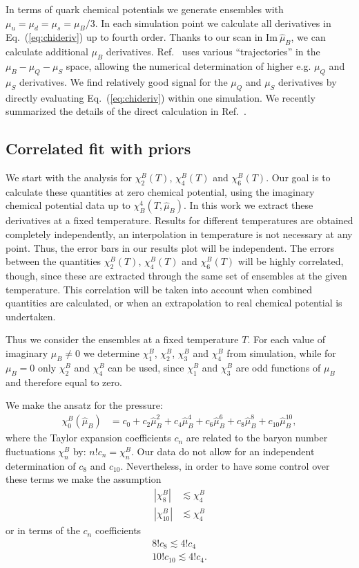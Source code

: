 \documentclass[a4paper,11pt]{article}
\begin{document}
In terms of quark chemical potentials we generate ensembles with $\mu_u=\mu_d=\mu_s=\mu_B/3$. 
In each simulation point we calculate all derivatives in Eq.~(\ref{eq:chideriv}) up to fourth order.
Thanks to our scan in $\mathrm{Im}~\hat\mu_B$, we can calculate additional $\mu_B$ derivatives.
Ref.~\cite{DElia:2016jqh} uses various ``trajectories'' in the $\mu_B-\mu_Q-\mu_S$ space, allowing
the numerical determination of higher e.g. $\mu_Q$ and $\mu_S$ derivatives. We find relatively good signal
for the $\mu_Q$ and $\mu_S$ derivatives by directly evaluating Eq.~(\ref{eq:chideriv}) within one simulation.
We recently summarized the details of the direct calculation in Ref.~\cite{Bellwied:2015lba}.

\subsection{Correlated fit with priors\label{sec:fit}}

We start with the analysis for $\chi_2^B(T)$, $\chi_4^B(T)$ and $\chi_6^B(T)$. Our goal is to
calculate these quantities at zero chemical potential, using the imaginary chemical potential data up to
$\chi_B^4(T,\hat\mu_B)$. In this work we extract these derivatives at a fixed temperature. Results
for different temperatures are obtained completely independently, an interpolation in temperature
is not necessary at any point. Thus, the error bars in our results plot will be independent.
The errors between the quantities $\chi_2^B(T)$, $\chi_4^B(T)$ and $\chi_6^B(T)$ will be highly correlated, though,
since these are extracted through the same set of ensembles at the given
temperature. This correlation will be taken into account when combined
quantities are calculated, or when an extrapolation to real chemical potential
is undertaken.




Thus we consider the ensembles at a fixed temperature $T$. For each value of
imaginary $\mu_B \neq 0$ we determine $\chi_1^B$, $\chi_2^B$, $\chi_3^B$ and
$\chi_4^B$ from simulation, while for $\mu_B=0$ only $\chi_2^B$ and $\chi_4^B$
can be used, since $\chi_1^B$ and $\chi_3^B$ are odd functions of $\mu_B$
and therefore equal to zero. 

We make the ansatz for the pressure:
\begin{align}
 \chi_0^B(\hat \mu_B) &= c_0 + c_2  \hat \mu_B^2 + c_4  \hat \mu_B^4 +c_6  \hat \mu_B^6 + c_8  \hat \mu_B^8+ c_{10}  \hat \mu_B^{10},
\end{align}
where the Taylor expansion coefficients $c_n$ are related to the baryon number fluctuations $\chi_n^B$ by: $n!c_n=\chi_n^B$. Our data do not allow for an independent determination of $c_8$ and $c_{10}$. Nevertheless, in order to have some control over these terms we make the assumption
\begin{align}
 |\chi^B_8| &\lesssim \chi_4^B\\
 |\chi^B_{10}| &\lesssim \chi_4^B
\label{eq:chi_constraint}
\end{align}
or in terms of the $c_n$ coefficients
\begin{align*}
 8! c_8 \lesssim 4!c_4\\
 10! c_{10} \lesssim 4!c_4.
\end{align*}
\end{document}
